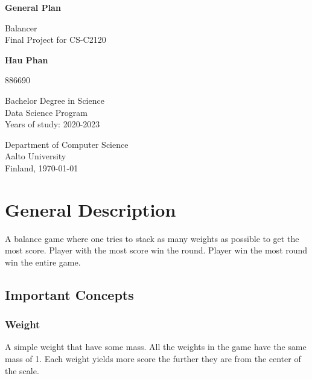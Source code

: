 \documentclass[12pt]{article}
\begin{document}
\begin{titlepage}
    \thispagestyle{fancy}
    \begin{center}
        \vspace*{1cm}
            
        \huge
        \textbf{General Plan}
            
        \vspace{0.5cm}
        \Large
        Balancer\\

        \normalsize
        \vspace{0.5cm}
        Final Project for CS-C2120
            
        \vspace{1.5cm}
            
        \textbf{Hau Phan}

        \normalsize
        886690
            
        \vfill

            
        Bachelor Degree in Science\\
        Data Science Program\\
        Years of study: 2020-2023
            
        \vspace{0.8cm}
            
        \normalsize
        Department of Computer Science\\
        Aalto University\\
        Finland, \today
    \end{center}
\end{titlepage}

\newpage

\tableofcontents
{}
\newpage

\section{General Description}
A balance game where one tries to stack as many weights as possible to get the
most score. Player with the most score win the round. Player win the most round
win the entire game.
\subsection{Important Concepts}
\subsubsection{Weight}
A simple weight that have some mass. All the weights in the game have the same
mass of 1. Each weight yields more score the further they are from the center of
the scale.
\end{document}
